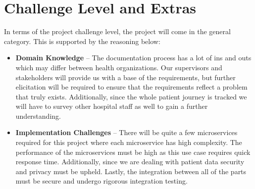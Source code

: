 \documentclass{article}
\begin{document}
\section{Challenge Level and Extras}


In terms of the project challenge level, the project will come in the general category. This is supported by the reasoning below:

\begin{itemize}
    \item \textbf{Domain Knowledge} -- The documentation process has a lot of ins and outs which may differ between health organizations. Our supervisors and stakeholders will provide us with a base of the requirements, but further elicitation will be required to ensure that the requirements reflect a problem that truly exists. Additionally, since the whole patient journey is tracked we will have to survey other hospital staff as well to gain a further understanding.
    \item \textbf{Implementation Challenges} -- There will be quite a few microservices required for this project where each microservice has high complexity. The performance of the microservices must be high as this use case requires quick response time. Additionally, since we are dealing with patient data security and privacy must be upheld. Lastly, the integration between all of the parts must be secure and undergo rigorous integration testing.
\end{itemize}
\end{document}
